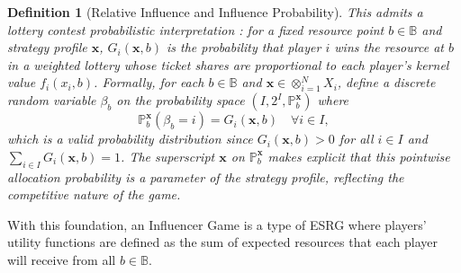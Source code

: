 \documentclass{article}
\newtheorem{definition}{Definition}
\begin{document}
\begin{definition}[Relative Influence and Influence Probability]
                    \noindent This admits a lottery contest probabilistic interpretation \cite{tullock1980efficient,skaperdas1996contest}: for a fixed resource point $b \in \mathbb{B}$ and strategy profile $\mathbf{x}$, $G_i(\mathbf{x},b)$ is the probability that player $i$ wins the resource at $b$ in a weighted lottery whose ticket shares are proportional to each player's kernel value $f_i(x_i,b)$. Formally, for each $b\in\mathbb{B}$ and $\mathbf{x}\in\otimes_{i=1}^N X_i$, define a discrete random variable $\beta_b$ on the probability space $(I, 2^I, \mathbb{P}_b^{\mathbf{x}})$ where
                    \begin{equation}\label{eq:SI_relative_influence_prob}
                        \mathbb{P}_b^{\mathbf{x}}(\beta_b = i) = G_i(\mathbf{x},b) \quad \forall i \in I,
                    \end{equation}
                    which is a valid probability distribution since $G_i(\mathbf{x},b)>0$ for all 
                    $i\in I$ and $\sum_{i \in I} G_i(\mathbf{x},b) = 1$. The superscript $\mathbf{x}$ on $\mathbb{P}_b^{\mathbf{x}}$ makes explicit that this pointwise allocation probability is a parameter of the strategy profile, reflecting the competitive nature of the game.
                \end{definition}
                With this foundation, an Influencer Game is a type of ESRG where players' utility functions are defined as the sum of expected resources that each player will receive from all $b\in \mathbb{B}$. 
\end{document}
